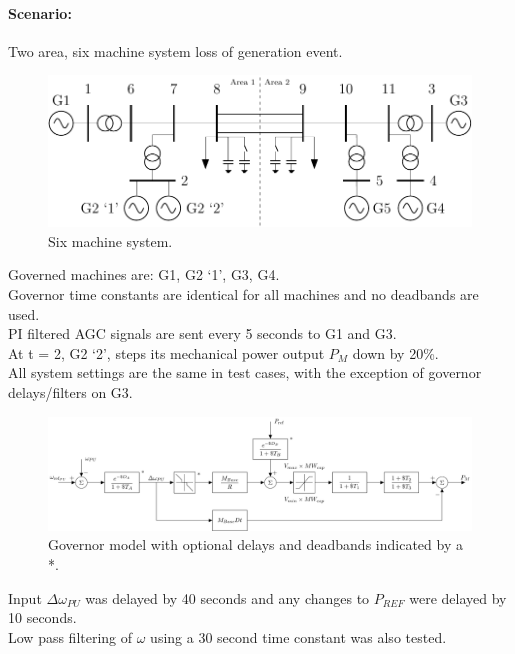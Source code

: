\documentclass[12pt]{article}
\begin{document}
\paragraph{Scenario: } 
Two area, six machine system loss of generation event. \\
\begin{figure}[!ht]
	\centering
	\footnotesize
	\includegraphics[width=.7\linewidth]{../../models/sixMachine/sixMachine}
	\caption{Six machine system.}
	\label{fig: six machine}
\end{figure}


Governed machines are: G1, G2 `1', G3, G4.\\
Governor time constants are identical for all machines and no deadbands are used.\\
PI filtered AGC signals are sent every 5 seconds to G1 and G3.\\

At t = 2, G2 `2', steps its mechanical power output $P_M$ down by 20\%.\\

All system settings are the same in test cases, with the exception of governor delays/filters on G3.\\

\begin{figure}[!ht]
	\centering
	\footnotesize
	\includegraphics[width=\linewidth]{../../models/tgov1/tgov1DBdelay}
	\caption{Governor model with optional delays and deadbands indicated by a *.}
	\label{fig: modified tgov}
\end{figure}

Input $\Delta \omega_{PU}$ was delayed by 40 seconds and any changes to $P_{REF}$ were delayed by 10 seconds. \\
Low pass filtering of $\omega$ using a 30 second time constant was also tested.
\end{document}
